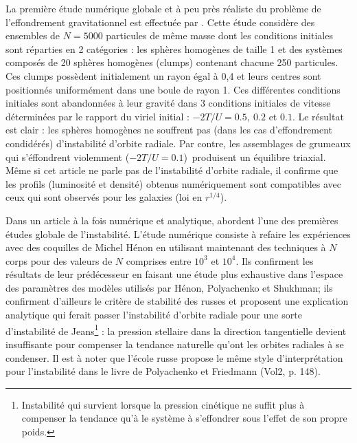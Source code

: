 La première étude numérique globale et à peu près réaliste du problème de l'effondrement gravitationnel est effectuée par  \cite{albada}. Cette étude
considère des ensembles de $N=5000$ particules de même masse dont les conditions initiales sont réparties en 2 catégories : les sphères homogènes de
taille 1 et des systèmes composés de 20 sphères homogènes (clumps) contenant chacune 250 particules. Ces clumps possèdent initialement un rayon égal à
0,4 et leurs centres sont positionnés uniformément dans une boule de rayon 1$.$ Ces différentes conditions initiales sont abandonnées à leur gravité
dans 3 conditions initiales de vitesse déterminées par le rapport du viriel initial : $-2T/U=0.5,~0.2$ et $0.1$. Le résultat est clair : les sphères
homogènes ne souffrent pas (dans les cas d'effondrement condidérés) d'instabilité d'orbite radiale. Par contre, les assemblages de grumeaux qui
s'éffondrent violemment ($-2T/U=0.1$)~produisent un équilibre triaxial. Même si cet article ne parle pas de l'instabilité d'orbite radiale, il confirme
que les profils (luminosité et densité) obtenus numériquement sont compatibles avec ceux qui sont observés pour les galaxies (loi en $r^{1/4}$).

Dans un article à la fois numérique et analytique, \cite{barneshut} abordent l'une des premières études globale de l'instabilité. L'étude numérique
consiste à refaire les expériences avec des coquilles de Michel Hénon en utilisant maintenant des techniques à $N$ corps pour des valeurs de $N$
comprises entre $10^{3}$ et $10^{4}$. Ils confirment les résultats de leur prédécesseur en faisant une étude plus exhaustive dans l'espace des
paramètres des modèles utilisés par Hénon, Polyachenko et Shukhman;  ils confirment d'ailleurs le critère de stabilité des russes et proposent une
explication analytique qui ferait passer l'instabilité d'orbite radiale pour une sorte d'instabilité de
Jeans\footnote{Instabilité qui survient lorsque la pression cinétique ne suffit plus à compenser la tendance qu'à le système à s'effondrer sous
l'effet de son propre poids.} : la pression stellaire dans la direction tangentielle devient insuffisante pour compenser la tendance naturelle qu'ont
les orbites radiales à se condenser. Il est à noter que l'école russe propose le même style d'interprétation pour l'instabilité dans le livre de
Polyachenko et Friedmann (Vol2, p. 148).

